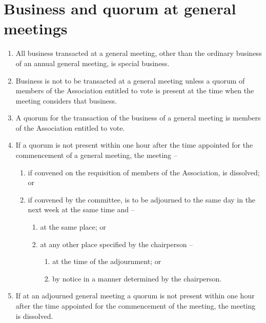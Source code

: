 \section{Business and quorum at general meetings}
\label{rule:quorum}

\begin{enumerate}
	\item All business transacted at a general meeting, other than the ordinary business of an annual general meeting, is special business.
	\item Business is not to be transacted at a general meeting unless a quorum of members of the Association entitled to vote is present at the time when the meeting considers that business.
	\item A quorum for the transaction of the business of a general meeting is \orgQuorum{} members of the Association entitled to vote.
	
	\item If a quorum is not present within one hour after the time appointed for the commencement of a general meeting, the meeting --
	\begin{enumerate}
		\item if convened on the requisition of members of the Association, is dissolved; or

		\item if convened by the committee, is to be adjourned to the same day in the next week at the same time and --
		\begin{enumerate}
			\item at the same place; or
			
			\item at any other place specified by the chairperson --
			\begin{enumerate}
				\item at the time of the adjournment; or
				\item by notice in a manner determined by the chairperson.
			\end{enumerate}
		\end{enumerate}
	\end{enumerate}
	
	\item If at an adjourned general meeting a quorum is not present within one hour after the time appointed for the commencement of the meeting, the meeting is dissolved.
\end{enumerate}